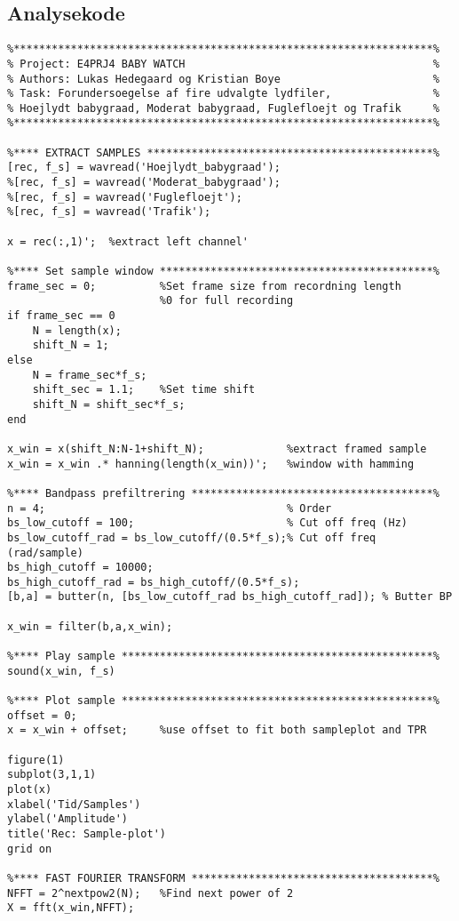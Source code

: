 \subsection{Analysekode}
\begin{verbatim}
%******************************************************************%
% Project: E4PRJ4 BABY WATCH                                       %
% Authors: Lukas Hedegaard og Kristian Boye                        %
% Task: Forundersoegelse af fire udvalgte lydfiler,                %
% Hoejlydt babygraad, Moderat babygraad, Fuglefloejt og Trafik     %
%******************************************************************%

%**** EXTRACT SAMPLES *********************************************%
[rec, f_s] = wavread('Hoejlydt_babygraad');
%[rec, f_s] = wavread('Moderat_babygraad');   
%[rec, f_s] = wavread('Fuglefloejt');
%[rec, f_s] = wavread('Trafik');  

x = rec(:,1)';  %extract left channel'

%**** Set sample window *******************************************%
frame_sec = 0;          %Set frame size from recordning length
                        %0 for full recording
if frame_sec == 0 
    N = length(x);
    shift_N = 1;
else
    N = frame_sec*f_s;
    shift_sec = 1.1;    %Set time shift
    shift_N = shift_sec*f_s;
end

x_win = x(shift_N:N-1+shift_N);             %extract framed sample
x_win = x_win .* hanning(length(x_win))';   %window with hamming

%**** Bandpass prefiltrering **************************************%
n = 4;                                      % Order
bs_low_cutoff = 100;                        % Cut off freq (Hz)
bs_low_cutoff_rad = bs_low_cutoff/(0.5*f_s);% Cut off freq (rad/sample)
bs_high_cutoff = 10000; 
bs_high_cutoff_rad = bs_high_cutoff/(0.5*f_s); 
[b,a] = butter(n, [bs_low_cutoff_rad bs_high_cutoff_rad]); % Butter BP

x_win = filter(b,a,x_win);

%**** Play sample *************************************************%
sound(x_win, f_s)

%**** Plot sample *************************************************%
offset = 0;
x = x_win + offset;     %use offset to fit both sampleplot and TPR

figure(1)
subplot(3,1,1)
plot(x)
xlabel('Tid/Samples')
ylabel('Amplitude')
title('Rec: Sample-plot')
grid on

%**** FAST FOURIER TRANSFORM **************************************% 
NFFT = 2^nextpow2(N);   %Find next power of 2
X = fft(x_win,NFFT);


\end{verbatim}
